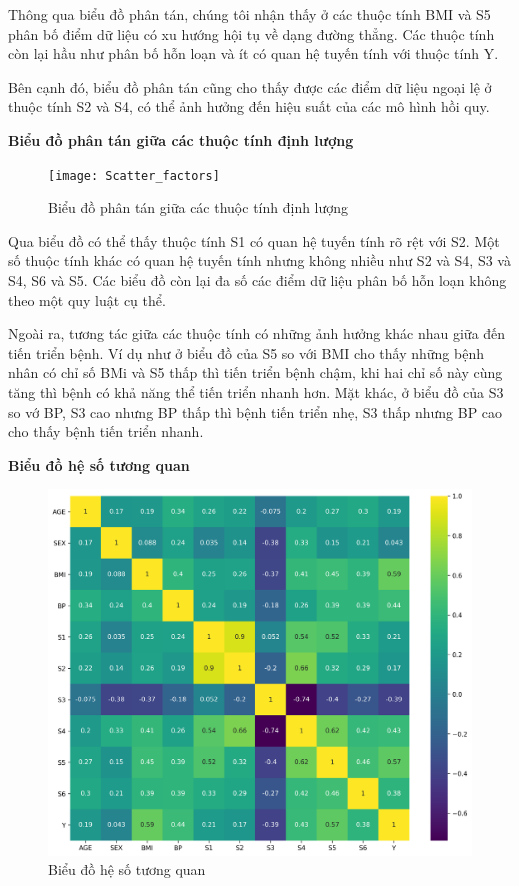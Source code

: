 \documentclass[runningheads]{llncs}
\begin{document}
Thông qua biểu đồ phân tán, chúng tôi nhận thấy ở các thuộc tính BMI và S5 phân bố điểm dữ liệu có xu hướng hội tụ về dạng đường thẳng. Các thuộc tính còn lại hầu như phân bố hỗn loạn và ít có quan hệ tuyến tính với thuộc tính Y.

Bên cạnh đó, biểu đồ phân tán cũng cho thấy được các điểm dữ liệu ngoại lệ ở thuộc tính S2 và S4, có thể ảnh hưởng đến hiệu suất của các mô hình hồi quy.

\vspace{0.5cm}
\textbf{Biểu đồ phân tán giữa các thuộc tính định lượng}

\begin{figure}[H]
\centering
\texttt{[image: Scatter\_factors]}
\caption{Biểu đồ phân tán giữa các thuộc tính định lượng} \label{fig2}
\end{figure}

Qua biểu đồ có thể thấy thuộc tính S1 có quan hệ tuyến tính rõ rệt với S2. Một số thuộc tính khác có quan hệ tuyến tính nhưng không nhiều như S2 và S4, S3 và S4, S6 và S5. Các biểu đồ còn lại đa số các điểm dữ liệu phân bố hỗn loạn không theo một quy luật cụ thể.

Ngoài ra, tương tác giữa các thuộc tính có những ảnh hưởng khác nhau giữa đến tiến triển bệnh. Ví dụ như ở biểu đồ của S5 so với BMI cho thấy những bệnh nhân có chỉ số BMi và S5 thấp thì tiến triển bệnh chậm, khi hai chỉ số này cùng tăng thì bệnh có khả năng thể tiến triển nhanh hơn. Mặt khác, ở biểu đồ của S3 so vớ BP, S3 cao nhưng BP thấp thì bệnh tiến triển nhẹ, S3 thấp nhưng BP cao cho thấy bệnh tiến triển nhanh.

\vspace{0.5cm}
\textbf{Biểu đồ hệ số tương quan}
\begin{figure}[H]
\centering
\includegraphics[width=\textwidth]{Corr}
\caption{Biểu đồ hệ số tương quan} \label{fig2}
\end{figure}
\end{document}
